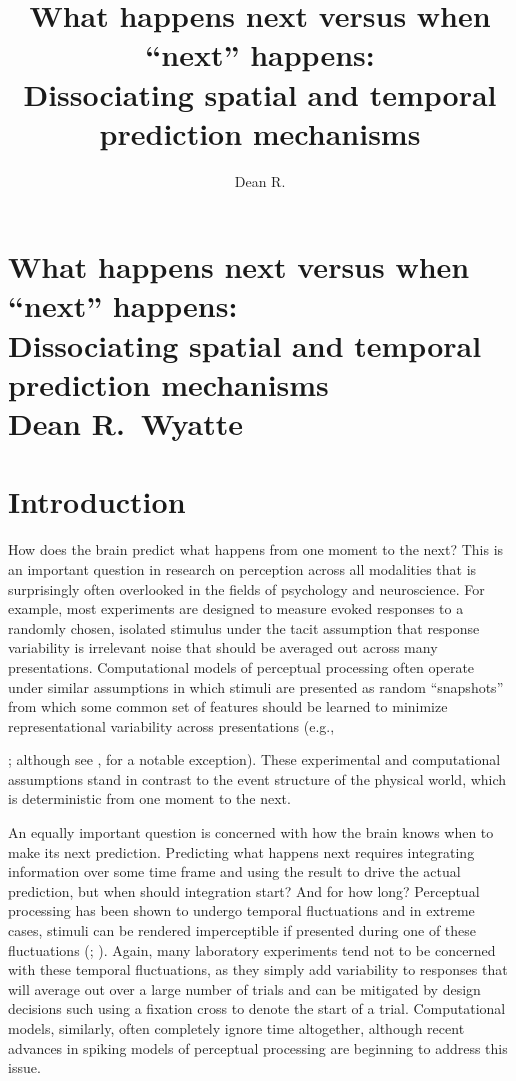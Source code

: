 \documentclass[defaultstyle,12pt]{thesis}
\title{What happens next versus when ``next'' happens: \\ Dissociating spatial and temporal prediction mechanisms}
\author{Dean R.}{Wyatte}
\begin{document}
\chapter*{What happens next versus when ``next'' happens: \\ Dissociating spatial and temporal prediction mechanisms \\ \vspace{20mm} Dean R.~Wyatte}

\chapter{Introduction}
How does the brain predict what happens from one moment to the next? This is an important question in research on perception across all modalities that is surprisingly often overlooked in the fields of psychology and neuroscience. For example, most experiments are designed to measure evoked responses to a randomly chosen, isolated stimulus under the tacit assumption that response variability is irrelevant noise that should be averaged out across many presentations. Computational models of perceptual processing often operate under similar assumptions in which stimuli are presented as random ``snapshots'' from which some common set of features should be learned to minimize representational variability across presentations (e.g., {; although see , for a notable exception). These experimental and computational assumptions stand in contrast to the event structure of the physical world, which is deterministic from one moment to the next. 

An equally important question is concerned with how the brain knows when to make its next prediction. Predicting what happens next requires integrating information over some time frame and using the result to drive the actual prediction, but when should integration start? And for how long? Perceptual processing has been shown to undergo temporal fluctuations and in extreme cases, stimuli can be rendered imperceptible if presented during one of these fluctuations (; ). Again, many laboratory experiments tend not to be concerned with these temporal fluctuations, as they simply add variability to responses that will average out over a large number of trials and can be mitigated by design decisions such using a fixation cross to denote the start of a trial. Computational models, similarly, often completely ignore time altogether, although recent advances in spiking models of perceptual processing \cite[e.g.,]{MasquelierThorpe07} are beginning to address this issue.

}
\end{document}

